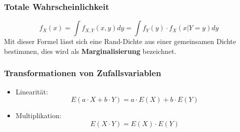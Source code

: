 \documentclass[12pt]{article}
\begin{document}
\subsubsection{Totale Wahrscheinlichkeit}
\begin{equation*}
	f_X(x) = \int f_{X,Y}(x,y)dy = \int f_Y(y) \cdot f_X(x|Y=y) dy
\end{equation*}
Mit dieser Formel lässt sich eine Rand-Dichte aus einer gemeinsamen Dichte bestimmen, dies wird als \textbf{Marginalisierung} bezeichnet.
\subsubsection{Transformationen von Zufallsvariablen}
\begin{itemize}
	\item Linearität:
	\begin{equation*}
		E(a\cdot X + b\cdot Y)=a\cdot E(X)+b\cdot E(Y)
	\end{equation*}
	\item Multiplikation:
	\begin{equation*}
		E(X\cdot Y) = E(X)\cdot E(Y)
	\end{equation*}
\end{itemize}
\end{document}
